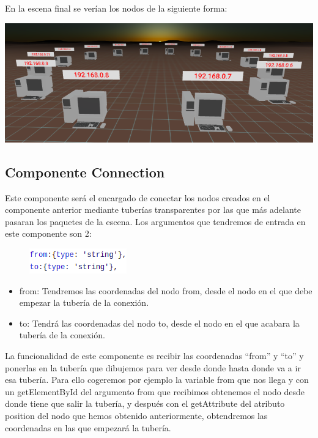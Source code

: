 \documentclass[a4paper, 12pt]{book}
\begin{document}
En la escena final se verían los nodos de la siguiente forma:
\begin{center}
    \includegraphics[scale=0.58]{img/componenteNode_modelo.png}
\end{center}


\subsection{Componente Connection}

Este componente será el encargado de conectar los nodos creados en el componente anterior mediante tuberías transparentes por las que más adelante pasaran los paquetes de la escena.
Los argumentos que tendremos de entrada en este componente son 2:


\begin{figure}[h]
\centering
    \includegraphics[scale=0.7]{img/arg_comp_connect.png}
\end{figure}

\begin{itemize}
    \item from: Tendremos las coordenadas del nodo from, desde el nodo en el que debe empezar la tubería de la conexión.
    
    \item to: Tendrá las coordenadas del nodo to, desde el nodo en el que acabara la tubería de la conexión.
    
\end{itemize}

La funcionalidad de este componente es recibir las coordenadas “from” y “to” y ponerlas en la tubería que dibujemos para ver desde donde hasta donde va a ir esa tubería.
Para ello cogeremos por ejemplo la variable from que nos llega y con un getElementById del argumento from que recibimos obtenemos el nodo desde donde tiene que salir la tubería, y después con el getAttribute del atributo position del nodo que hemos obtenido anteriormente, obtendremos las coordenadas en las que empezará la tubería.
\end{document}
